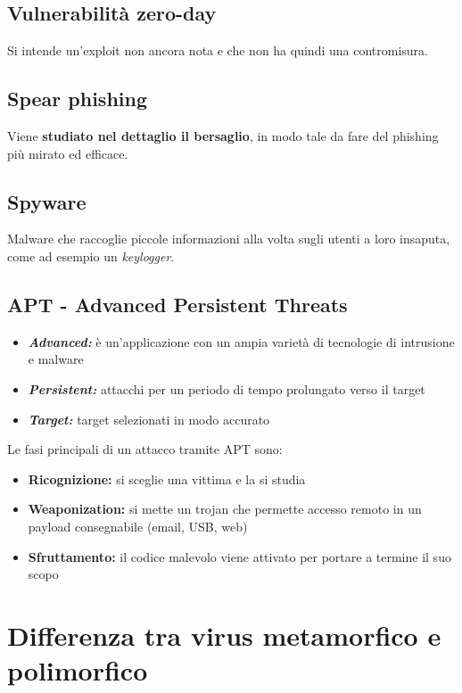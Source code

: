 \documentclass{report}
\begin{document}
\subsection{Vulnerabilità zero-day}
Si intende un'exploit non ancora nota e che non ha quindi una contromisura.

\subsection{Spear phishing}
Viene \textbf{studiato nel dettaglio il bersaglio}, in modo tale da fare del phishing più mirato 
ed efficace.

\subsection{Spyware}
Malware che raccoglie piccole informazioni alla volta sugli utenti a loro insaputa,
come ad esempio un \textit{keylogger}.

\subsection{APT - Advanced Persistent Threats}
\begin{itemize}
    \item \textit{\textbf{Advanced:}} è un'applicazione con un ampia varietà di tecnologie di intrusione e malware
    \item \textit{\textbf{Persistent:}}
    attacchi per un periodo di tempo prolungato verso il target
    \item \textit{\textbf{Target:}} target selezionati in modo accurato
\end{itemize}

\noindent Le fasi principali di un attacco tramite APT sono:
\begin{itemize}
    \item \textbf{Ricognizione:} si sceglie una vittima e la si studia 
    \item \textbf{Weaponization:} si mette un trojan che permette accesso remoto in un payload consegnabile (email, USB, web)
    \item \textbf{Sfruttamento:} il codice malevolo viene attivato per portare a termine il suo scopo
\end{itemize}



\section{Differenza tra virus metamorfico e polimorfico}
\end{document}
